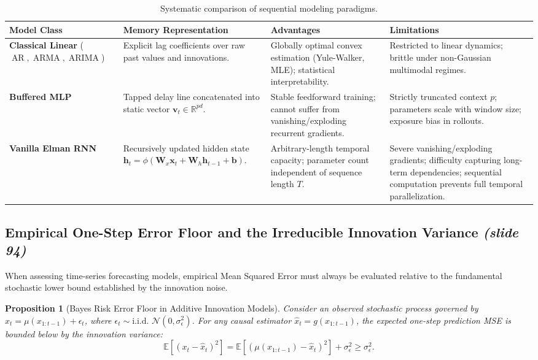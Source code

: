 \documentclass[11pt,a4paper]{article}
\theoremstyle{definition}
\theoremstyle{plain}
\newtheorem{proposition}{Proposition}[section]
\begin{document}
\begin{table}[htbp]
\centering
\small
\begin{tabular}{@{}p{3.2cm}p{3.6cm}p{4.2cm}p{3.8cm}@{}}
\toprule
\textbf{Model Class} & \textbf{Memory Representation} & \textbf{Advantages} & \textbf{Limitations} \\ \midrule
\textbf{Classical Linear} \newline ($\operatorname{AR}, \operatorname{ARMA}, \operatorname{ARIMA}$) & Explicit lag coefficients over raw past values and innovations. & Globally optimal convex estimation (Yule-Walker, MLE); statistical interpretability. & Restricted to linear dynamics; brittle under non-Gaussian multimodal regimes. \\ \addlinespace
\textbf{Buffered MLP} & Tapped delay line concatenated into static vector $\mathbf{v}_t \in \mathbb{R}^{pd}$. & Stable feedforward training; cannot suffer from vanishing/exploding recurrent gradients. & Strictly truncated context $p$; parameters scale with window size; exposure bias in rollouts. \\ \addlinespace
\textbf{Vanilla Elman RNN} & Recursively updated hidden state $\mathbf{h}_t = \phi(\mathbf{W}_x \mathbf{x}_t + \mathbf{W}_h \mathbf{h}_{t-1} + \mathbf{b})$. & Arbitrary-length temporal capacity; parameter count independent of sequence length $T$. & Severe vanishing/exploding gradients; difficulty capturing long-term dependencies; sequential computation prevents full temporal parallelization. \\ \bottomrule
\end{tabular}
\caption{Systematic comparison of sequential modeling paradigms.}
\label{tab:comparison}
\end{table}

\subsection{Empirical One-Step Error Floor and the Irreducible Innovation Variance \emph{(slide 94)}}
When assessing time-series forecasting models, empirical Mean Squared Error must always be evaluated relative to the fundamental stochastic lower bound established by the innovation noise.

\begin{proposition}[Bayes Risk Error Floor in Additive Innovation Models]
Consider an observed stochastic process governed by $x_t = \mu(x_{1:t-1}) + \epsilon_t$, where $\epsilon_t \sim \text{i.i.d. } \mathcal{N}(0, \sigma_\epsilon^2)$. For any causal estimator $\hat{x}_t = g(x_{1:t-1})$, the expected one-step prediction MSE is bounded below by the innovation variance:
\begin{equation}
    \mathbb{E}\left[(x_t - \hat{x}_t)^2\right] = \mathbb{E}\left[(\mu(x_{1:t-1}) - \hat{x}_t)^2\right] + \sigma_\epsilon^2 \ge \sigma_\epsilon^2.
\end{equation}
\end{proposition}
\end{document}
